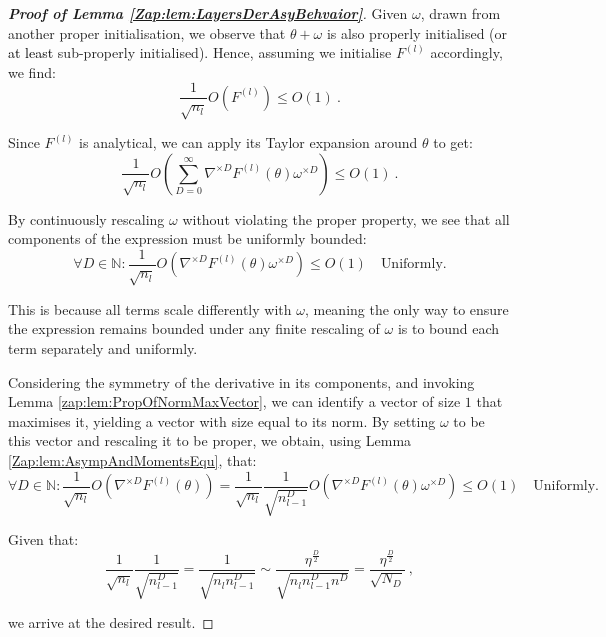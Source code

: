 \documentclass{article} %
\begin{document}
\begin{proof}[\textbf{Proof of Lemma \ref{Zap:lem:LayersDerAsyBehvaior}}]

Given \(\omega\), drawn from another proper initialisation, we observe that \(\theta+\omega\) is also properly initialised (or \textcolor{black}{at least} sub-properly initialised). Hence, assuming we initialise \(F^{(l)}\) accordingly, we find:
\begin{equation}
\frac{1}{\sqrt{n_{l}}}O\left(F^{(l)}\right)\leq O\left(1\right) \ .
\end{equation}

Since \(F^{(l)}\) is analytical, we can apply its Taylor expansion around \(\theta\) to get:
\begin{equation}
\frac{1}{\sqrt{n_{l}}}O\left(\sum_{D=0}^{\infty}\nabla^{\times D}F^{(l)}\left(\theta\right)\omega^{\times D}\right)\leq O\left(1\right) \ .
\end{equation}

By continuously rescaling \(\omega\) without violating the proper property, we see that all components of the expression must be uniformly bounded:
\begin{equation}
\forall D\in\mathbb{N}:\frac{1}{\sqrt{n_{l}}}O\left(\nabla^{\times D}F^{(l)}\left(\theta\right)\omega^{\times D}\right)\leq O\left(1\right)\quad\text{Uniformly.}
\end{equation}

This is because all terms scale differently with \(\omega\), meaning the only way to ensure the expression remains bounded under any finite rescaling of \(\omega\) is to bound each term separately and uniformly.

Considering the symmetry of the derivative in its components, and invoking Lemma \ref{zap:lem:PropOfNormMaxVector}, we can identify a vector of size \(1\) that maximises it, yielding a vector with size equal to its norm. By setting \(\omega\) to be this vector and rescaling it to be proper, we obtain, using Lemma \ref{Zap:lem:AsympAndMomentsEqu}, that:
\begin{equation}
\forall D\in\mathbb{N}:\frac{1}{\sqrt{n_{l}}}O\left(\nabla^{\times D}F^{(l)}\left(\theta\right)\right)=\frac{1}{\sqrt{n_{l}}}\frac{1}{\sqrt{n_{l-1}^{D}}}O\left(\nabla^{\times D}F^{(l)}\left(\theta\right)\omega^{\times D}\right)\leq O\left(1\right)\quad\text{Uniformly.}
\end{equation}

Given that:
\begin{equation}
\frac{1}{\sqrt{n_{l}}}\frac{1}{\sqrt{n_{l-1}^{D}}}=\frac{1}{\sqrt{n_{l}n_{l-1}^{D}}}\sim\frac{\eta^{\frac{D}{2}}}{\sqrt{n_{l}n_{l-1}^{D}n^{D}}}=\frac{\eta^{\frac{D}{2}}}{\sqrt{N_{D}}} \ ,
\end{equation}

we arrive at the desired result.
\end{proof}
\end{document}
